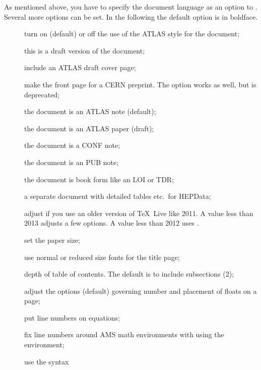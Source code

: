As mentioned above, you have to specify the document language as an option to .
Several more options can be set.
In the following the default option is in boldface.
\begin{description}
\item[] turn on (default) or off the use of the ATLAS style for the document;
\item[] this is a draft version of the document;
\item[] include an ATLAS draft cover page;
\item[] make the front page for a CERN preprint.
  The option  works as well, but is deprecated;
\item[] the document is an ATLAS note (default);
\item[] the document is an ATLAS paper (draft);
\item[] the document is a CONF note;
\item[] the document is an PUB note;
\item[] the document is book form like an LOI or TDR;
\item[] a separate document with detailed tables etc.\ for HEPData;
\item[] adjust if you use an older version of \TeX\ Live like 2011.
  A value less than 2013 adjusts a few  options.
  A value less than 2012 uses .
\item[] set the paper size;
\item[] use normal or reduced size fonts for the title page;
\item[] depth of table of contents. The default is to include subsections (2);
\item[] adjust the options (default) governing number and placement of floats on a page;
\item[] put line numbers on equations;
\item[] fix line numbers around AMS math environments with using the  environment;
\item[] use the syntax 

\end{description}

